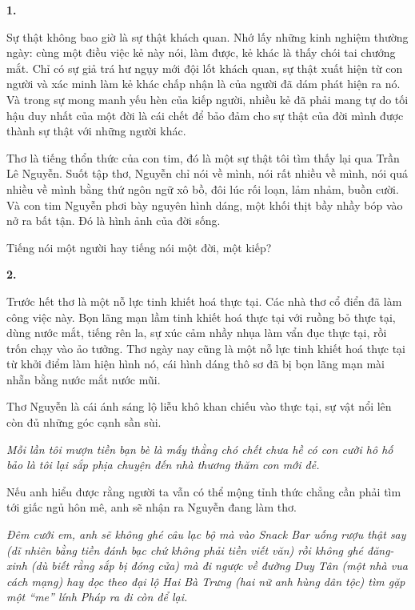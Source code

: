 \documentclass[../main.tex]{subfiles}
\begin{document}
\begin{multicols}{2}

\textbf{1. } 
 
Sự thật không bao giờ là sự thật khách quan. Nhớ lấy những kinh nghiệm thường ngày: cùng một điều việc kẻ này nói, làm được, kẻ khác là thấy chói tai chướng mắt. Chỉ có sự giả trá hư ngụy mới đội lốt khách quan, sự thật xuất hiện từ con người và xác minh làm kẻ khác chấp nhận là của người đã dám phát hiện ra nó. Và trong sự mong manh yếu hèn của kiếp người, nhiều kẻ đã phải mang tự do tối hậu duy nhất của một đời là cái chết để bảo đảm cho sự thật của đời mình được thành sự thật với những người khác. 
 
Thơ là tiếng thổn thức của con tim, đó là một sự thật tôi tìm thấy lại qua Trần Lê Nguyễn. Suốt tập thơ, Nguyễn chỉ nói về mình, nói rất nhiều về mình, nói quá nhiều về mình bằng thứ ngôn ngữ xô bồ, đôi lúc rối loạn, lảm nhảm, buồn cười. Và con tim Nguyễn phơi bày nguyên hình dáng, một khối thịt bầy nhầy bóp vào nở ra bất tận. Đó là hình ảnh của đời sống. 
 
Tiếng nói một người hay tiếng nói một đời, một kiếp? 
 
 
\textbf{2.} 
 
Trước hết thơ là một nỗ lực tinh khiết hoá thực tại. Các nhà thơ cổ điển đã làm công việc này. Bọn lãng mạn lầm tinh khiết hoá thực tại với ruồng bỏ thực tại, dùng nước mắt, tiếng rên la, sự xúc cảm nhầy nhụa làm vẩn đục thực tại, rồi trốn chạy vào ảo tưởng. Thơ ngày nay cũng là một nỗ lực tinh khiết hoá thực tại từ khởi điểm làm hiện hình nó, cái hình dáng thô sơ đã bị bọn lãng mạn mài nhẵn bằng nước mắt nước mũi. 
 
Thơ Nguyễn là cái ánh sáng lộ liễu khô khan chiếu vào thực tại, sự vật nổi lên còn đủ những góc cạnh sần sùi. 
\begin{blockquote}
 
\textit{Mỗi lần tôi mượn tiền bạn bè là mấy thằng chó chết chưa hề có con cười hô hố bảo là tôi lại sắp phịa chuyện đến nhà thương thăm con mới đẻ.} 

\end{blockquote}
 
Nếu anh hiểu được rằng người ta vẫn có thể mộng tỉnh thức chẳng cần phải tìm tới giấc ngủ hôn mê, anh sẽ nhận ra Nguyễn đang làm thơ. 
\begin{blockquote}
 
\textit{Đêm cưới em, anh sẽ không ghé câu lạc bộ mà vào Snack Bar uống rượu thật say (dĩ nhiên bằng tiền đánh bạc chứ không phải tiền viết văn) rồi không ghé đăng-xinh (dù biết rằng sắp bị đóng cửa) mà đi ngược về đường Duy Tân (một nhà vua cách mạng) hay dọc theo đại lộ Hai Bà Trưng (hai nữ anh hùng dân tộc) tìm gặp một “me” lính Pháp ra đi còn để lại.} 
        

\end{blockquote}
\end{multicols}
\end{document}
